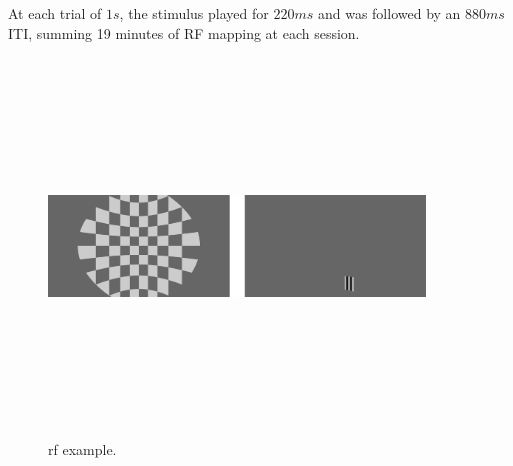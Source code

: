 At each trial of $1 s$, the stimulus played for $220 ms$ and was followed by an $880ms$ ITI, summing 19 minutes of RF mapping at each session. 

 \begin{table}[H]
\begin{center}\par
{}
 \caption{Configurations regarding the RF mapping protocol stimuli properties.}
    \vspace{-5mm}
    \label{table:RF}
\end{center}
\end{table}

\begin{figure}[H] \centering \includegraphics[width=10cm,height=10cm,keepaspectratio]{Figures/4.Chapter/rf.png} \caption{rf example.} \end{figure}

